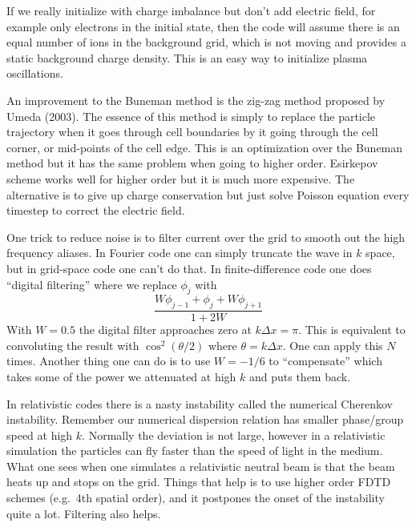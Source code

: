 \documentclass[letterpaper, 11pt]{article}
\numberwithin{equation}{section}
\numberwithin{figure}{section}
\begin{document}
If we really initialize with charge imbalance but don't add electric field, for
example only electrons in the initial state, then the code will assume there is
an equal number of ions in the background grid, which is not moving and provides
a static background charge density. This is an easy way to initialize plasma
oscillations.

An improvement to the Buneman method is the zig-zag method proposed by Umeda
(2003). The essence of this method is simply to replace the particle trajectory
when it goes through cell boundaries by it going through the cell corner, or
mid-points of the cell edge. This is an optimization over the Buneman method but
it has the same problem when going to higher order. Esirkepov scheme works well
for higher order but it is much more expensive. The alternative is to give up
charge conservation but just solve Poisson equation every timestep to correct
the electric field.

One trick to reduce noise is to filter current over the grid to smooth out the
high frequency aliases. In Fourier code one can simply truncate the wave in $k$
space, but in grid-space code one can't do that. In finite-difference code one
does ``digital filtering'' where we replace $\phi_j$ with
\begin{equation}
  \label{eq:5}
  \frac{W\phi_{j - 1} + \phi_j + W\phi_{j + 1}}{1 + 2W}
\end{equation}
With $W = 0.5$ the digital filter approaches zero at $k\Delta x = \pi$. This is
equivalent to convoluting the result with $\cos^2(\theta / 2)$ where $\theta =
k\Delta x$. One can apply this $N$ times. Another thing one can do is to use $W
= -1/6$ to ``compensate'' which takes some of the power we attenuated at high
$k$ and puts them back.

In relativistic codes there is a nasty instability called the numerical
Cherenkov instability. Remember our numerical dispersion relation has smaller
phase/group speed at high $k$. Normally the deviation is not large, however in a
relativistic simulation the particles can fly faster than the speed of light in
the medium. What one sees when one simulates a relativistic neutral beam is that
the beam heats up and stops on the grid. Things that help is to use higher order
FDTD schemes (e.g.\ 4th spatial order), and it postpones the onset of the
instability quite a lot. Filtering also helps.
\end{document}
